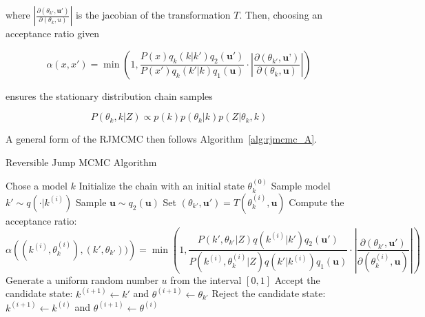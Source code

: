 where $\left|\frac{\partial(\theta_{k'}, \textbf{u}')}{\partial(\theta_k, u)} \right|$ is the jacobian of the transformation $T$. Then, choosing an acceptance ratio given 
 
 \begin{equation}
 \label{eq:alpharj}
  \alpha\left(x, x'\right) = \min\left(1, \frac{P(x)q_k(k | k')q_2(\textbf{u}') }{P(x')q_k(k' | k)q_1(\textbf{u}) }\cdot\left|\frac{\partial(\theta_{k'}, \textbf{u'})}{\partial(\theta_k, \mathbf{u})} \right|\right)
 \end{equation}


ensures the stationary distribution chain samples

\begin{equation}
P(\theta_k, k | Z) \propto p(k)p(\theta_k|k)p(Z | \theta_k, k)
\end{equation}

A general form of the RJMCMC then follows Algorithm~\ref{alg:rjmcmc_A}.

\begin{algorithm}[H]
\caption{Reversible Jump MCMC Algorithm}
\label{alg:rjmcmc_A}
\begin{algorithmic}[1]
    \State Chose a model $k$
    \State Initialize the chain with an initial state $\theta^{(0)}_{k}$
         \State Sample model $k' \sim q(\cdot | k^{(i)})$
         \State Sample $\mathbf{u} \sim q_2(\textbf{u})$
	\State Set $(\theta_{k'}, \mathbf{u'}) = T(\theta_k^{(i)}, \mathbf{u})$
        \State Compute the acceptance ratio:
        \[
        \alpha \left((k^{(i)}, \theta_k^{(i)}), (k', \theta_{k'})) \right) = \min\left(1, \frac{P\left(k', \theta_{k'} | Z\right)q(k^{(i)}|k')q_{2}(\mathbf{u}')}{P\left(k^{(i)}, \theta^{(i)}_{k} | Z\right)q(k' | k^{(i)})q_{1}(\textbf{u})} \cdot \left| \frac{\partial(\theta_{k'}, \textbf{u}')}{\partial(\theta_k^{(i)}, \textbf{u})}\right| \right)
        \]
        \State Generate a uniform random number $u$ from the interval $[0, 1]$
            \State Accept the candidate state: $k^{(i + 1)} \leftarrow k'$ and  $\theta^{(i+1)} \leftarrow \theta_{k'}$
        \Else
            \State Reject the candidate state:$k^{(i + 1)} \leftarrow k^{(i)}$ and  $\theta^{(i+1)} \leftarrow \theta^{(i)}$
        \EndIf
    \EndFor
\end{algorithmic}
\end{algorithm}





